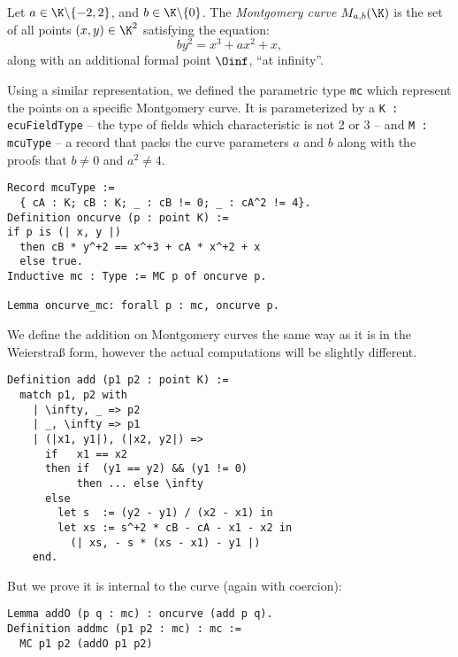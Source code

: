 \begin{dfn}
  Let $a \in \K \backslash \{-2, 2\}$, and $b \in \K \backslash \{ 0\}$.
  The \textit{Montgomery curve} $M_{a,b}(\K)$ is the set of all points
  $(x,y) \in \K^2$ satisfying the equation:
  $$by^2 = x^3 + ax^2 + x,$$
  along with an additional formal point $\Oinf$, ``at infinity''.
\end{dfn}
Using a similar representation, we defined the parametric type \texttt{mc} which
represent the points on a specific Montgomery curve. It is parameterized by
a \texttt{K : ecuFieldType} -- the type of fields which characteristic is not 2 or 3 --
and \texttt{M : mcuType} -- a record that packs the curve parameters $a$ and $b$
along with the proofs that $b \neq 0$ and $a^2 \neq 4$.
\begin{lstlisting}[language=Coq]
Record mcuType :=
  { cA : K; cB : K; _ : cB != 0; _ : cA^2 != 4}.
Definition oncurve (p : point K) :=
if p is (| x, y |)
  then cB * y^+2 == x^+3 + cA * x^+2 + x
  else true.
Inductive mc : Type := MC p of oncurve p.

Lemma oncurve_mc: forall p : mc, oncurve p.
\end{lstlisting}
We define the addition on Montgomery curves the same way as it is in the Weierstra{\ss} form,
however the actual computations will be slightly different.
\begin{lstlisting}[language=Coq]
Definition add (p1 p2 : point K) :=
  match p1, p2 with
    | \infty, _ => p2
    | _, \infty => p1
    | (|x1, y1|), (|x2, y2|) =>
      if   x1 == x2
      then if  (y1 == y2) && (y1 != 0)
           then ... else \infty
      else
        let s  := (y2 - y1) / (x2 - x1) in
        let xs := s^+2 * cB - cA - x1 - x2 in
          (| xs, - s * (xs - x1) - y1 |)
    end.
\end{lstlisting}
But we prove it is internal to the curve (again with coercion):
\begin{lstlisting}[language=Coq]
Lemma addO (p q : mc) : oncurve (add p q).
Definition addmc (p1 p2 : mc) : mc :=
  MC p1 p2 (addO p1 p2)
\end{lstlisting}

